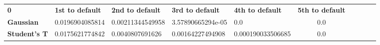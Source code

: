 \begin{tabular}{|l|l|l|l|l|c|c|c|c|c|}
\hline
\textbf{0} & \textbf{1st to default} & \textbf{2nd to default} & \textbf{3rd to default} & \textbf{4th to default} & \textbf{5th to default}\\\hhline{|=|=|=|=|=|=|}
\textbf{Gaussian} & 0.0196904085814 & 0.00211344549958 & 3.57890665294e-05 & 0.0 & 0.0\\
\textbf{Student's T} & 0.0175621774842 & 0.0040807691626 & 0.00164227494908 & 0.000190033506685 & 0.0\\
\hline
\end{tabular}
